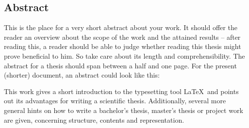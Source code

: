 \subsection*{Abstract}
This is the place for a very short abstract about your work. 
It should offer the reader an overview about the scope of the work and the attained results -- after reading this, a reader should be able to judge whether reading this thesis might prove beneficial to him.
So take care about its length and comprehensibility.
The abstract for a thesis should span between a half and one page.
For the present (shorter) document, an abstract could look like this:

This work gives a short introduction to the typesetting tool \LaTeX\ and points out its advantages for writing a scientific thesis. 
Additionally, several more general hints on how to write a bachelor's thesis, master's thesis or project work are given, concerning structure, contents and representation.


